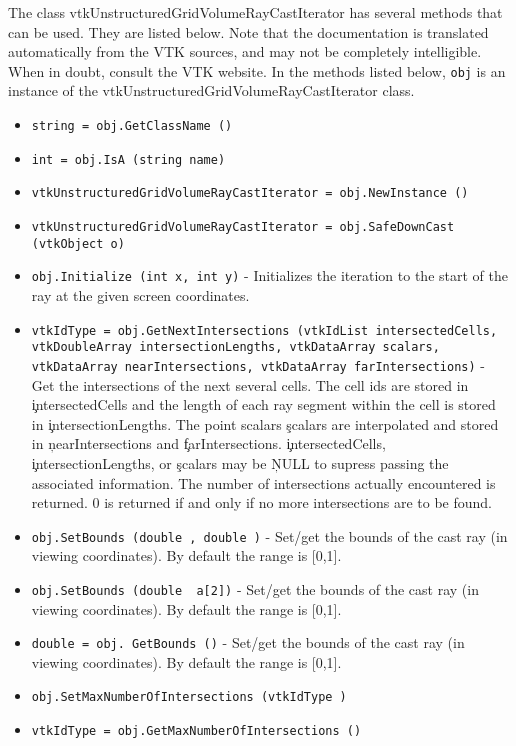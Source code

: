 The class vtkUnstructuredGridVolumeRayCastIterator has several methods that can be used.
  They are listed below.
Note that the documentation is translated automatically from the VTK sources,
and may not be completely intelligible.  When in doubt, consult the VTK website.
In the methods listed below, \verb|obj| is an instance of the vtkUnstructuredGridVolumeRayCastIterator class.
\begin{itemize}
\item  \verb|string = obj.GetClassName ()|

\item  \verb|int = obj.IsA (string name)|

\item  \verb|vtkUnstructuredGridVolumeRayCastIterator = obj.NewInstance ()|

\item  \verb|vtkUnstructuredGridVolumeRayCastIterator = obj.SafeDownCast (vtkObject o)|

\item  \verb|obj.Initialize (int x, int y)| -  Initializes the iteration to the start of the ray at the given screen
 coordinates.

\item  \verb|vtkIdType = obj.GetNextIntersections (vtkIdList intersectedCells, vtkDoubleArray intersectionLengths, vtkDataArray scalars, vtkDataArray nearIntersections, vtkDataArray farIntersections)| -  Get the intersections of the next several cells.  The cell ids are
 stored in \c intersectedCells and the length of each ray segment
 within the cell is stored in \c intersectionLengths.  The point
 scalars \c scalars are interpolated and stored in \c nearIntersections
 and \c farIntersections.  \c intersectedCells, \c intersectionLengths,
 or \c scalars may be \c NULL to supress passing the associated
 information.  The number of intersections actually encountered is
 returned.  0 is returned if and only if no more intersections are to
 be found.

\item  \verb|obj.SetBounds (double , double )| -  Set/get the bounds of the cast ray (in viewing coordinates).  By
 default the range is [0,1].

\item  \verb|obj.SetBounds (double  a[2])| -  Set/get the bounds of the cast ray (in viewing coordinates).  By
 default the range is [0,1].

\item  \verb|double = obj. GetBounds ()| -  Set/get the bounds of the cast ray (in viewing coordinates).  By
 default the range is [0,1].

\item  \verb|obj.SetMaxNumberOfIntersections (vtkIdType )|

\item  \verb|vtkIdType = obj.GetMaxNumberOfIntersections ()|

\end{itemize}
